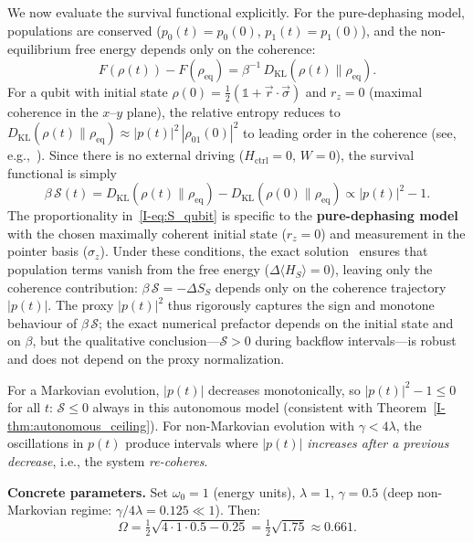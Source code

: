 \documentclass[12pt,a4paper,openany]{book}
\begin{document}
We now evaluate the survival functional explicitly.
For the pure-dephasing model, populations are conserved
($p_0(t) = p_0(0)$, $p_1(t) = p_1(0)$), and the non-equilibrium
free energy depends only on the coherence:
\begin{equation}
\label{I-eq:F_qubit}
F(\rho(t)) - F(\rho_{\mathrm{eq}})
= \beta^{-1}\, D_{\mathrm{KL}}(\rho(t) \| \rho_{\mathrm{eq}}).
\end{equation}
For a qubit with initial state
$\rho(0) = \tfrac{1}{2}(\mathbb{1} + \vec{r}\cdot\vec{\sigma})$
and $r_z = 0$ (maximal coherence in the $x$--$y$ plane),
the relative entropy reduces to
$D_{\mathrm{KL}}(\rho(t) \| \rho_{\mathrm{eq}})
\approx |p(t)|^2\, |\rho_{01}(0)|^2$
to leading order in the coherence (see,
e.g.,~\cite{BreuerPetruccione2002}).
Since there is no external driving ($H_{\mathrm{ctrl}} = 0$,
$W = 0$), the survival functional is simply
\begin{equation}
\label{I-eq:S_qubit}
\beta\,\mathcal{S}(t)
= D_{\mathrm{KL}}(\rho(t) \| \rho_{\mathrm{eq}})
  - D_{\mathrm{KL}}(\rho(0) \| \rho_{\mathrm{eq}})
\propto |p(t)|^2 - 1.
\end{equation}
The proportionality in~\eqref{I-eq:S_qubit} is specific to
the \textbf{pure-dephasing model} with the chosen maximally
coherent initial state ($r_z = 0$) and measurement in the
pointer basis ($\sigma_z$).
Under these conditions, the exact
solution~\cite{BreuerPetruccione2002} ensures that population
terms vanish from the free energy
($\Delta\langle H_S \rangle = 0$), leaving only the
coherence contribution:
$\beta\,\mathcal{S} = -\Delta S_S$ depends only on the
coherence trajectory $|p(t)|$.
The proxy $|p(t)|^2$ thus rigorously captures the sign and
monotone behaviour of $\beta\,\mathcal{S}$; the exact
numerical prefactor depends on the initial state and
on $\beta$, but the qualitative conclusion---$\mathcal{S} > 0$
during backflow intervals---is robust and does not depend on
the proxy normalization.

For a Markovian evolution, $|p(t)|$ decreases monotonically,
so $|p(t)|^2 - 1 \leq 0$ for all $t$: $\mathcal{S} \leq 0$
always in this autonomous model (consistent with
Theorem~\ref{I-thm:autonomous_ceiling}).
For non-Markovian evolution with $\gamma < 4\lambda$, the
oscillations in $p(t)$ produce intervals where $|p(t)|$
\emph{increases after a previous decrease}, i.e., the system
\emph{re-coheres}.

\textbf{Concrete parameters.}
Set $\omega_0 = 1$ (energy units), $\lambda = 1$,
$\gamma = 0.5$ (deep non-Markovian regime: $\gamma / 4\lambda = 0.125 \ll 1$).
Then:
\begin{equation}
\Omega = \tfrac{1}{2}\sqrt{4 \cdot 1 \cdot 0.5 - 0.25}
= \tfrac{1}{2}\sqrt{1.75} \approx 0.661.
\end{equation}
\end{document}
